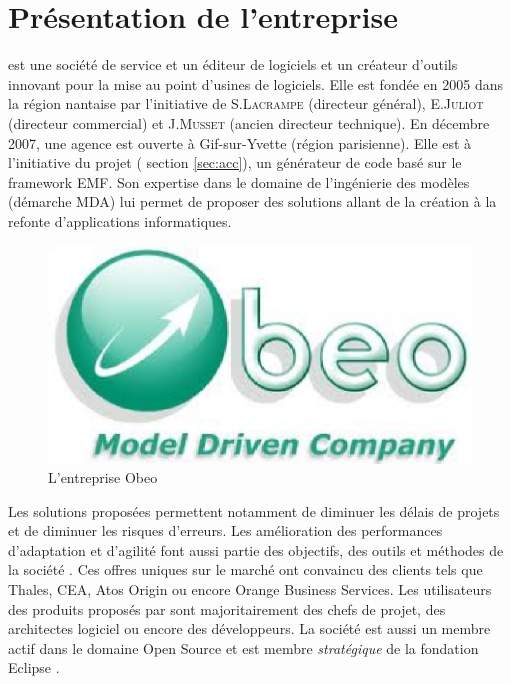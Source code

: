 \section{Présentation de l'entreprise}
\kwobeo{} est une société de service et un éditeur de logiciels et un créateur d'outils innovant pour la mise au point d'usines de logiciels\cite{obeo}.  Elle est fondée en 2005 dans la région nantaise par l'initiative de S.\textsc{Lacrampe} (directeur général), E.\textsc{Juliot} (directeur commercial) et J.\textsc{Musset} (ancien directeur technique). En décembre 2007, une agence est ouverte à Gif-sur-Yvette (région parisienne). Elle est à l'initiative du projet \kwacceleo{} (\cf{} section \ref{sec:acc}), un générateur de code basé sur le framework EMF. Son expertise dans le domaine de l'ingénierie des modèles (démarche MDA) lui permet de proposer des solutions allant de la création à la refonte d'applications informatiques. 
\begin{figure}[htb]
  \centering
  \includegraphics[scale=.45]{img/logoobeo.eps}
  \caption{L'entreprise Obeo}
\end{figure}


Les solutions proposées permettent notamment de diminuer les délais de projets et de diminuer les risques d'erreurs. Les amélioration des performances d'adaptation et d'agilité font aussi partie des objectifs, des outils et méthodes de la société \kwobeo{}. Ces offres uniques sur le marché ont convaincu des clients tels que Thales, CEA, Atos Origin ou encore Orange Business Services. Les utilisateurs des produits proposés par \kwobeo sont majoritairement des chefs de projet, des architectes logiciel ou encore des développeurs.
La société \kwobeo{} est aussi un membre actif dans le domaine Open Source et est membre \emph{stratégique} de la fondation Eclipse \cite{fondation}.

\clearpage

